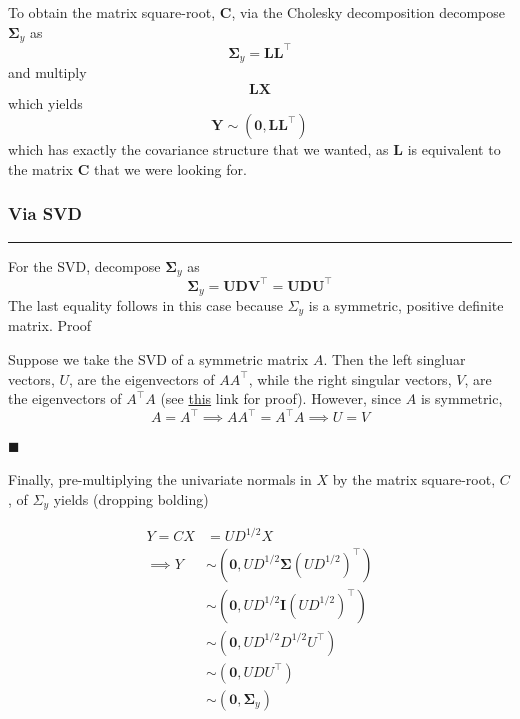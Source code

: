 \documentclass[
]{article}
\begin{document}
To obtain the matrix square-root, \(\boldsymbol{C}\), via the Cholesky
decomposition decompose \(\boldsymbol{\Sigma}_y\) as
\[\boldsymbol{\Sigma}_y = \boldsymbol{LL}^\top\] and multiply
\[\boldsymbol{LX}\] which yields
\[\boldsymbol{Y} \sim (\boldsymbol{0}, \boldsymbol{LL^\top})\] which has
exactly the covariance structure that we wanted, as \(\boldsymbol{L}\)
is equivalent to the matrix \(\boldsymbol{C}\) that we were looking for.

\hfill\break

\hypertarget{via-svd}{%
\subsubsection{Via SVD}\label{via-svd}}

\begin{center}\rule{0.5\linewidth}{0.5pt}\end{center}

For the SVD, decompose \(\boldsymbol{\Sigma}_y\) as
\[\boldsymbol{\Sigma}_y = \boldsymbol{UDV}^\top = \boldsymbol{UDU}^\top\]
The last equality follows in this case because \(\Sigma_y\) is a
symmetric, positive definite matrix. Proof

\leavevmode\hypertarget{SVD}{}%
\hfill\break

Suppose we take the SVD of a symmetric matrix \(A\). Then the left
singluar vectors, \(U\), are the eigenvectors of \(AA^\top\), while the
right singular vectors, \(V\), are the eigenvectors of \(A^\top A\) (see
\href{https://math.mit.edu/classes/18.095/2016IAP/lec2/SVD_Notes.pdf}{this}
link for proof). However, since \(A\) is symmetric,
\[A = A^\top \implies AA^\top = A^\top A \implies U = V\]

{\(\blacksquare\)}

\hfill\break

Finally, pre-multiplying the univariate normals in \(X\) by the matrix
square-root, \(C\), of \(\Sigma_y\) yields (dropping bolding)

\begin{align}
Y= CX &= UD^{1/2} X \nonumber \\[1ex]
\implies Y &\sim \left(\boldsymbol{0}, UD^{1/2}\boldsymbol{\Sigma }(UD^{1/2})^\top \right) \nonumber \\[1ex]
& \sim \left(\boldsymbol{0}, UD^{1/2}\boldsymbol{I} (UD^{1/2})^\top \right) \nonumber \\[1ex]
& \sim \left(\boldsymbol{0}, UD^{1/2}D^{1/2}U^\top\right) \nonumber \\[1ex]
& \sim \left(\boldsymbol{0} , UDU^\top\right) \nonumber \\[1ex]
& \sim \left(\boldsymbol{0} , \boldsymbol{\Sigma}_y\right) \nonumber \\[1ex]
\end{align}
\end{document}
